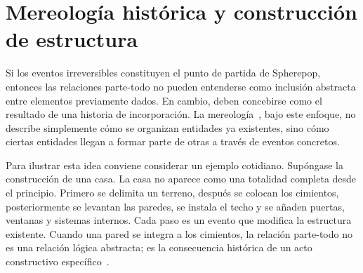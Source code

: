 \documentclass[12pt]{article}
\theoremstyle{plain}
\theoremstyle{definition}
\begin{document}
\section{Mereología histórica y construcción de estructura}
\label{sec:mereologia}

Si los eventos irreversibles constituyen el punto de partida de Spherepop, entonces las relaciones parte-todo no pueden entenderse como inclusión abstracta entre elementos previamente dados. En cambio, deben concebirse como el resultado de una historia de incorporación. La mereología~\cite{simons,varzi,casati}, bajo este enfoque, no describe simplemente cómo se organizan entidades ya existentes, sino cómo ciertas entidades llegan a formar parte de otras a través de eventos concretos.

Para ilustrar esta idea conviene considerar un ejemplo cotidiano. Supóngase la construcción de una casa. La casa no aparece como una totalidad completa desde el principio. Primero se delimita un terreno, después se colocan los cimientos, posteriormente se levantan las paredes, se instala el techo y se añaden puertas, ventanas y sistemas internos. Cada paso es un evento que modifica la estructura existente. Cuando una pared se integra a los cimientos, la relación parte-todo no es una relación lógica abstracta; es la consecuencia histórica de un acto constructivo específico~\cite{simons}.
\end{document}
